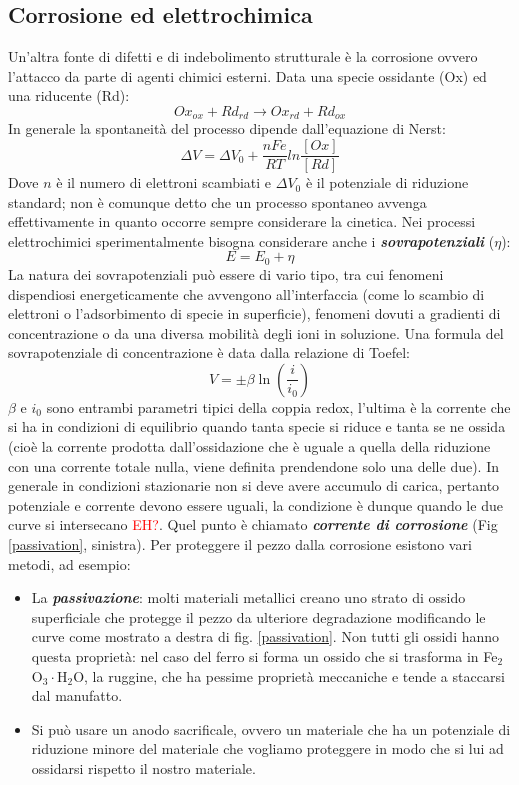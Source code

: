 \subsection{Corrosione ed elettrochimica}

Un'altra fonte di difetti e di indebolimento strutturale è la corrosione ovvero l'attacco da parte di agenti chimici esterni. Data una specie ossidante (Ox) ed una riducente (Rd):
$$Ox_{ox}+Rd_{rd}\rightarrow Ox_{rd}+Rd_{ox}$$
In generale la spontaneità del processo dipende dall'equazione di Nerst:
\begin{equation}
    \Delta V=\Delta V_0+\frac{nFe}{RT}ln\frac{[Ox]}{[Rd]}
\end{equation}
Dove $n$ è il numero di elettroni scambiati e $\Delta V_0$ è il potenziale di riduzione standard; non è comunque detto che un processo spontaneo avvenga effettivamente in quanto occorre sempre considerare la cinetica. Nei processi elettrochimici sperimentalmente bisogna considerare anche i \textbf{\textit{sovrapotenziali}} ($\eta$):
\begin{equation}
    E=E_0+\eta
\end{equation}
La natura dei sovrapotenziali può essere di vario tipo, tra cui fenomeni dispendiosi energeticamente che avvengono all'interfaccia (come lo scambio di elettroni o l'adsorbimento di specie in superficie), fenomeni dovuti a gradienti di concentrazione o da una diversa mobilità degli ioni in soluzione.
Una formula del sovrapotenziale di concentrazione è data dalla relazione di Toefel:
\begin{equation}
    V=\pm\beta\ln\left(\frac{i}{i_0}\right)
\end{equation}
$\beta$ e $i_0$ sono entrambi parametri tipici della coppia redox, l'ultima è la corrente che si ha in condizioni di equilibrio quando tanta specie si riduce e tanta se ne ossida (cioè la corrente prodotta dall'ossidazione che è uguale a quella della riduzione con una corrente totale nulla, viene definita prendendone solo una delle due). In generale in condizioni stazionarie non si deve avere accumulo di carica, pertanto potenziale e corrente devono essere uguali, la condizione è dunque quando le due curve si intersecano \textcolor{red}{EH?}. Quel punto è chiamato \textit{\textbf{corrente di corrosione}} (Fig \ref{passivation}, sinistra).
Per proteggere il pezzo dalla corrosione esistono vari metodi, ad esempio:
\begin{itemize}
    \item La \textbf{\textit{passivazione}}: molti materiali metallici creano uno strato di ossido superficiale che protegge il pezzo da ulteriore degradazione modificando le curve come mostrato a destra di fig. \ref{passivation}. Non tutti gli ossidi hanno questa proprietà: nel caso del ferro si forma un ossido che si trasforma in Fe$_2$O$_3\cdot$H$_2$O, la ruggine, che ha pessime proprietà meccaniche e tende a staccarsi dal manufatto.
    \item Si può usare un anodo sacrificale, ovvero un materiale che ha un potenziale di riduzione minore del materiale che vogliamo proteggere in modo che si lui ad ossidarsi rispetto il nostro materiale.
\end{itemize}

